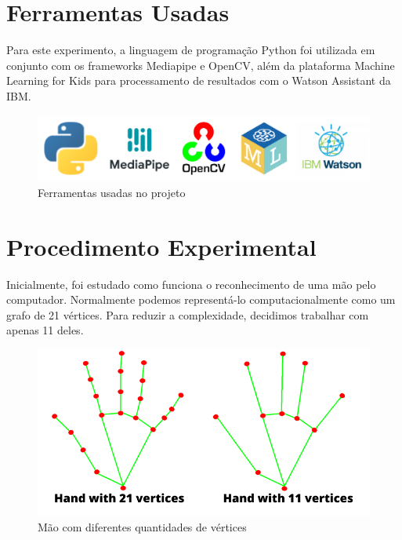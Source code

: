 \documentclass[a4paper, 12pt]{article}
\begin{document}
\newpage
\section{Ferramentas Usadas}

Para este experimento, a linguagem de programação Python\cite{python} foi utilizada em conjunto com os frameworks Mediapipe\cite{mediapipe} e OpenCV\cite{opencv}, além da plataforma Machine Learning for Kids\cite{ml4kids} para processamento de resultados com o Watson Assistant da IBM\cite{watson}.

\begin{figure}[!ht]
\centering
\includegraphics[scale=0.9]{img/tools.png}
\caption{Ferramentas usadas no projeto}
\label{figure_2}
\end{figure}


\section{Procedimento Experimental}

Inicialmente, foi estudado como funciona o reconhecimento de uma mão pelo computador. Normalmente podemos representá-lo computacionalmente como um grafo de 21 vértices. Para reduzir a complexidade, decidimos trabalhar com apenas 11 deles.
 
\begin{figure}[!ht]
\centering
\includegraphics[scale=0.4]{img/hand_vertices.png}
\caption{Mão com diferentes quantidades de vértices}
\label{figure_3}
\end{figure}
\end{document}
